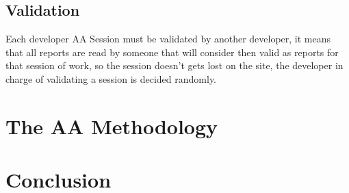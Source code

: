 \documentclass[letterpaper]{article}
\begin{document}
\subsection{Validation}

Each developer AA Session must be validated by another developer, it means that
all reports are read by someone that will consider then valid as reports for
that session of work, so the session doesn't gets lost on the site, the
developer in charge of validating a session is decided randomly.


\section{The AA Methodology}

\section{Conclusion}


%
%


\end{document}
